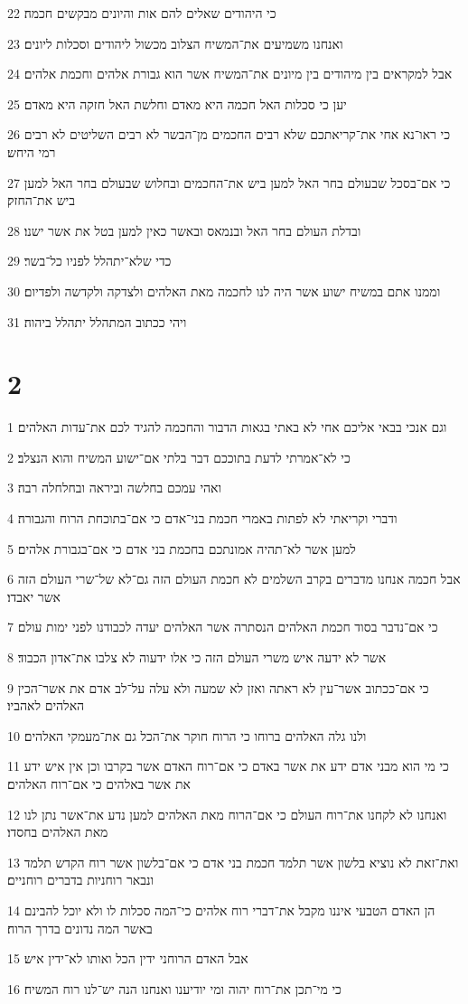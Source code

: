 \par 22 כי היהודים שאלים להם אות והיונים מבקשים חכמה׃
\par 23 ואנחנו משמיעים את־המשיח הצלוב מכשול ליהודים וסכלות ליונים׃
\par 24 אבל למקראים בין מיהודים בין מיונים את־המשיח אשר הוא גבורת אלהים וחכמת אלהים׃
\par 25 יען כי סכלות האל חכמה היא מאדם וחלשת האל חזקה היא מאדם׃
\par 26 כי ראו־נא אחי את־קריאתכם שלא רבים החכמים מן־הבשר לא רבים השליטים לא רבים רמי היחש׃
\par 27 כי אם־בסכל שבעולם בחר האל למען ביש את־החכמים ובחלוש שבעולם בחר האל למען ביש את־החזק׃
\par 28 ובדלת העולם בחר האל ובנמאס ובאשר כאין למען בטל את אשר ישנו׃
\par 29 כדי שלא־יתהלל לפניו כל־בשר׃
\par 30 וממנו אתם במשיח ישוע אשר היה לנו לחכמה מאת האלהים ולצדקה ולקדשה ולפדיום׃
\par 31 ויהי ככתוב המתהלל יתהלל ביהוה׃

\chapter{2}

\par 1 וגם אנכי בבאי אליכם אחי לא באתי בגאות הדבור והחכמה להגיד לכם את־עדות האלהים׃
\par 2 כי לא־אמרתי לדעת בתוככם דבר בלתי אם־ישוע המשיח והוא הנצלב׃
\par 3 ואהי עמכם בחלשה וביראה ובחלחלה רבה׃
\par 4 ודברי וקריאתי לא לפתות באמרי חכמת בני־אדם כי אם־בתוכחת הרוח והגבורה׃
\par 5 למען אשר לא־תהיה אמונתכם בחכמת בני אדם כי אם־בגבורת אלהים׃
\par 6 אבל חכמה אנחנו מדברים בקרב השלמים לא חכמת העולם הזה גם־לא של־שרי העולם הזה אשר יאבדו׃
\par 7 כי אם־נדבר בסוד חכמת האלהים הנסתרה אשר האלהים יעדה לכבודנו לפני ימות עולם׃
\par 8 אשר לא ידעה איש משרי העולם הזה כי אלו ידעוה לא צלבו את־אדון הכבוד׃
\par 9 כי אם־ככתוב אשר־עין לא ראתה ואזן לא שמעה ולא עלה על־לב אדם את אשר־הכין האלהים לאהביו׃
\par 10 ולנו גלה האלהים ברוחו כי הרוח חוקר את־הכל גם את־מעמקי האלהים׃
\par 11 כי מי הוא מבני אדם ידע את אשר באדם כי אם־רוח האדם אשר בקרבו וכן אין איש ידע את אשר באלהים כי אם־רוח האלהים׃
\par 12 ואנחנו לא לקחנו את־רוח העולם כי אם־הרוח מאת האלהים למען נדע את־אשר נתן לנו מאת האלהים בחסדו׃
\par 13 ואת־זאת לא נוציא בלשון אשר תלמד חכמת בני אדם כי אם־בלשון אשר רוח הקדש תלמד ונבאר רוחניות בדברים רוחניים׃
\par 14 הן האדם הטבעי איננו מקבל את־דברי רוח אלהים כי־המה סכלות לו ולא יוכל להבינם באשר המה נדונים בדרך הרוח׃
\par 15 אבל האדם הרוחני ידין הכל ואותו לא־ידין איש׃
\par 16 כי מי־תכן את־רוח יהוה ומי יודיענו ואנחנו הנה יש־לנו רוח המשיח׃

